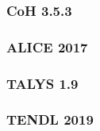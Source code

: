 \documentclass[a4paper,11pt,twoside]{book}
\begin{document}
\subsubsection{CoH 3.5.3}
\subsubsection{ALICE 2017}
\subsubsection{TALYS 1.9}
\subsubsection{TENDL 2019}





\end{document}
